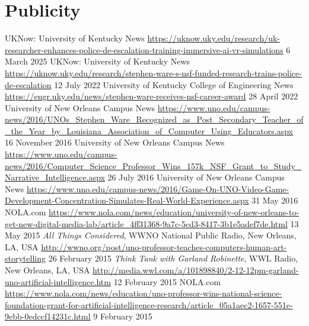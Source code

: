 \documentclass{cv}
\begin{document}
\section*{Publicity}
	{UKNow: University of Kentucky News}
	{\url{https://uknow.uky.edu/research/uk-researcher-enhances-police-de-escalation-training-immersive-ai-vr-simulations}}
	{6 March 2025}
	{UKNow: University of Kentucky News}
	{\url{https://uknow.uky.edu/research/stephen-ware-s-nsf-funded-research-trains-police-de-escalation}}
	{12 July 2022}
	{University of Kentucky College of Engineering News}
	{\url{https://engr.uky.edu/news/stephen-ware-receives-nsf-career-award}}
	{28 April 2022}
	{University of New Orleans Campus News}
	{\url{https://www.uno.edu/campus-news/2016/UNOs_Stephen_Ware_Recognized_as_Post_Secondary_Teacher_of_the_Year_by_Louisiana_Association_of_Computer_Using_Educators.aspx}}
	{16 November 2016}
	{University of New Orleans Campus News}
	{\url{https://www.uno.edu/campus-news/2016/Computer_Science_Professor_Wins_157k_NSF_Grant_to_Study_Narrative_Intelligence.aspx}}
	{26 July 2016}
	{University of New Orleans Campus News}
	{\url{https://www.uno.edu/campus-news/2016/Game-On-UNO-Video-Game-Development-Concentration-Simulates-Real-World-Experience.aspx}}
	{31 May 2016}
	{NOLA.com}
	{\url{https://www.nola.com/news/education/university-of-new-orleans-to-get-new-digital-media-lab/article_4ff31368-9a7c-5cd3-8417-3b1e5adef7de.html}}
	{13 May 2015}
	{{\em All Things Considered}, WWNO National Public Radio, New Orleans, LA, USA}
	{\url{http://wwno.org/post/uno-professor-teaches-computers-human-art-storytelling}}
	{26 February 2015}
	{{\em Think Tank with Garland Robinette}, WWL Radio, New Orleans, LA, USA}
	{\url{http://media.wwl.com/a/101898840/2-12-12pm-garland-uno-artificial-intelligence.htm}}
	{12 February 2015}
	{NOLA.com}
	{\url{https://www.nola.com/news/education/uno-professor-wins-national-science-foundation-grant-for-artificial-intelligence-research/article_05a1aec2-1657-551e-9ebb-0edccf14231c.html}}
	{9 February 2015}
\end{document}
